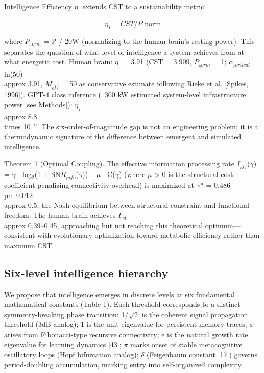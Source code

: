 \documentclass[a4paper,12pt]{article}
\begin{document}
Intelligence Efficiency $\eta_{_I}$ extends CST to a sustainability metric:


\begin{equation}
\eta_I = CST / P\_{\text{norm}} \tag{5}
\end{equation}


where $P_{_norm}$ = P / 20W (normalizing to the human brain's resting power). This separates the question of what level of intelligence a system achieves from at what energetic cost. Human brain: $\eta_{_I}$ = 3.91 (CST = 3.909, $P_{_norm}$ = 1; $\alpha_{_cortical}$ = ln(50)  \\approx  3.91, $M_{_eff}$ = 50 as conservative estimate following Rieke et al. [Spikes, 1996]). GPT-4 class inference (~300 kW estimated system-level infrastructure power [see Methods]): $\eta_{_I}$  \\approx  8.8 \\times 10$^{-6}$. The six-order-of-magnitude gap is not an engineering problem; it is a thermodynamic signature of the difference between emergent and simulated intelligence.


Theorem 1 (Optimal Coupling). The effective information processing rate $I_{_eff}$($\gamma$) = $\gamma$  $\cdot$  log$_2$(1 + SN$R_{_info}$($\gamma$)) -- $\mu$  $\cdot$  C($\gamma$) (where $\mu$ > 0 is the structural cost coefficient penalizing connectivity overhead) is maximized at $\gamma$* = 0.486  \\pm  0.012  \\approx  0.5, the Nash equilibrium between structural constraint and functional freedom. The human brain achieves $\Gamma_{st}$  \\approx  0.39--0.45, approaching but not reaching this theoretical optimum---consistent with evolutionary optimization toward metabolic efficiency rather than maximum CST.



\subsection{Six-level intelligence hierarchy}

We propose that intelligence emerges in discrete levels at six fundamental mathematical constants (Table 1). Each threshold corresponds to a distinct symmetry-breaking phase transition: 1/$\sqrt{2}$ is the coherent signal propagation threshold (3dB analog); 1 is the unit eigenvalue for persistent memory traces; $\phi$ arises from Fibonacci-type recursive connectivity; e is the natural growth rate eigenvalue for learning dynamics [43]; $\pi$ marks onset of stable metacognitive oscillatory loops (Hopf bifurcation analog); $\delta$ (Feigenbaum constant [17]) governs period-doubling accumulation, marking entry into self-organized complexity.
\end{document}
